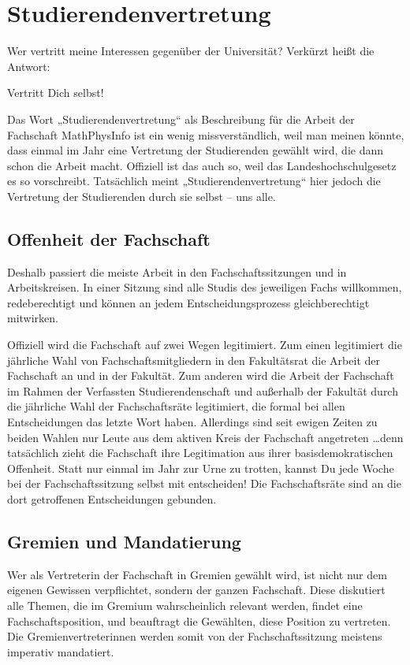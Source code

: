 \section[Studierendenvertretung in der Fachschaft]{Studierendenvertretung}

Wer vertritt meine Interessen gegenüber der Universität? Verkürzt heißt die Antwort: 

Vertritt Dich selbst!

Das Wort „Studierendenvertretung“ als Beschreibung für die Arbeit der Fachschaft MathPhysInfo ist ein wenig missverständlich, weil man meinen könnte, dass einmal im Jahr eine Vertretung der Studierenden gewählt wird, die dann schon die Arbeit macht. Offiziell ist das auch so, weil das Landeshochschulgesetz es so vorschreibt. Tatsächlich meint „Studierendenvertretung“ hier jedoch die Vertretung der Studierenden durch sie selbst -- uns alle.

\subsection{Offenheit der Fachschaft}
Deshalb passiert die meiste Arbeit in den Fachschaftssitzungen und in Arbeitskreisen. In einer Sitzung sind alle Studis des jeweiligen Fachs willkommen, redeberechtigt und können an jedem Entscheidungsprozess gleichberechtigt mitwirken.

Offiziell wird die Fachschaft auf zwei Wegen legitimiert. Zum einen legitimiert die jährliche Wahl von Fachschaftsmitgliedern in den Fakultätsrat die Arbeit der Fachschaft an und in der Fakultät. Zum anderen wird die Arbeit der Fachschaft im Rahmen der Verfassten Studierendenschaft und außerhalb der Fakultät durch die jährliche Wahl der Fachschaftsräte legitimiert, die formal bei allen Entscheidungen das letzte Wort haben. Allerdings sind seit ewigen Zeiten zu beiden Wahlen nur Leute aus dem aktiven Kreis der Fachschaft angetreten \dots denn tatsächlich zieht die Fachschaft ihre Legitimation aus ihrer basisdemokratischen Offenheit. Statt nur einmal im Jahr zur Urne zu trotten, kannst Du jede Woche bei der Fachschaftssitzung selbst mit entscheiden! Die Fachschaftsräte sind an die dort getroffenen Entscheidungen gebunden.

\subsection{Gremien und Mandatierung}
Wer als Vertreterin der Fachschaft in Gremien gewählt wird, ist nicht nur dem eigenen Gewissen verpflichtet, sondern der ganzen Fachschaft. Diese diskutiert alle Themen, die im Gremium wahrscheinlich relevant werden, findet eine Fachschaftsposition, und beauftragt die Gewählten, diese Position zu vertreten. Die Gremienvertreterinnen werden somit von der Fachschaftssitzung meistens imperativ mandatiert.

